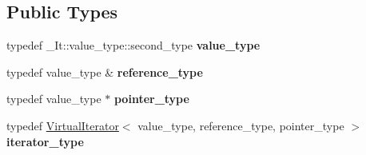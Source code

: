 \subsection*{Public Types}
\begin{DoxyCompactItemize}
\item 
typedef \+\_\+\+It\+::value\+\_\+type\+::second\+\_\+type {\bfseries value\+\_\+type}\hypertarget{classAudio_1_1VirtualValuesIterator_a833511d3c79da1afbeae104df53e4b73}{}\label{classAudio_1_1VirtualValuesIterator_a833511d3c79da1afbeae104df53e4b73}

\item 
typedef value\+\_\+type \& {\bfseries reference\+\_\+type}\hypertarget{classAudio_1_1VirtualValuesIterator_a81aa12dd81640331a17d9eabf72a62a0}{}\label{classAudio_1_1VirtualValuesIterator_a81aa12dd81640331a17d9eabf72a62a0}

\item 
typedef value\+\_\+type $\ast$ {\bfseries pointer\+\_\+type}\hypertarget{classAudio_1_1VirtualValuesIterator_a264fc0006e4bd28c442a84af201020aa}{}\label{classAudio_1_1VirtualValuesIterator_a264fc0006e4bd28c442a84af201020aa}

\item 
typedef \hyperlink{classAudio_1_1VirtualIterator}{Virtual\+Iterator}$<$ value\+\_\+type, reference\+\_\+type, pointer\+\_\+type $>$ {\bfseries iterator\+\_\+type}\hypertarget{classAudio_1_1VirtualValuesIterator_a93cacb2f9d61d81aef89d7389b92fe7e}{}\label{classAudio_1_1VirtualValuesIterator_a93cacb2f9d61d81aef89d7389b92fe7e}

\end{DoxyCompactItemize}
